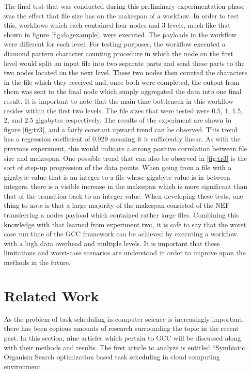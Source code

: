 \documentclass[fleqn,10pt]{SelfArx} %
\begin{document}
The final test that was conducted during this preliminary experimentation phase was the effect that file size has on the makespan of a workflow. In order to test this, workflows which each contained four nodes and 3 levels, much like that shown in figure \ref{fig:dagexample}, were executed. The payloads in the workflow were different for each level. For testing purposes, the workflow executed a diamond pattern character counting procedure in which the node on the first level would split an input file into two separate parts and send these parts to the two nodes located on the next level. These two nodes then counted the characters in the file which they received and, once both were completed, the output from them was sent to the final node which simply aggregated the data into one final result. It is important to note that the main time bottleneck in this workflow resides within the first two levels. The file sizes that were tested were 0.5, 1, 1.5, 2, and 2.5 gigabytes respectively. The results of the experiment are shown in figure \ref{fig:tr3}, and a fairly constant upward trend can be observed. This trend has a regression coefficient of 0.929 meaning it is sufficiently linear. As with the previous experiment, this would indicate a strong positive correlation between file size and makespan. One possible trend that can also be observed in \ref{fig:tr3} is the sort of step-up progression of the data points. When going from a file with a gigabyte value that is an integer to a file whose gigabyte value is in between integers, there is a visible increase in the makespan which is more significant than that of the transition back to an integer value. When developing these tests, one thing to note is that a large majority of the makespan consisted of the NEF transferring a nodes payload which contained rather large files. Combining this knowledge with that learned from experiment two, it is safe to say that the worst case run time of the GCC framework can be achieved by executing a workflow with a high data overhead and multiple levels. It is important that these limitations and worst-case scenarios are understood in order to improve upon the methods in the future.


\section{Related Work}
\label{sec:relatedwork}

As the problem of task scheduling in computer science is increasingly important, there has been copious amounts of research surrounding the topic in the recent past. In this section, nine articles which pertain to GCC will be discussed along with their methods and results. The first article to analyze is entitled “Symbiotic Organism Search optimization based task scheduling in cloud computing environment
\end{document}

